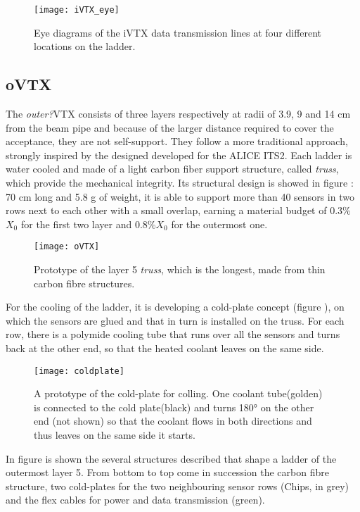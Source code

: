 \begin{figure}[h!]
\centering
\texttt{[image: iVTX\_eye]}
\caption{Eye diagrams of the iVTX data transmission lines at four different locations on the ladder.}
\label{fig:iVTX_eye}
\end{figure}


\subsection{oVTX}

The \textit{outer?}VTX consists of three layers respectively at radii of 3.9, 9 and 14 cm from the beam pipe and because of the larger distance required to cover the acceptance, they are not self-support. They follow a more traditional approach, strongly inspired by the designed developed for the ALICE ITS2. Each ladder is water cooled and made of a light carbon fiber support structure, called \textit{truss}, which provide the mechanical integrity. Its structural design is showed in figure : 70 cm long and 5.8 g of weight, it is able to support more than 40 sensors in two rows next to each other with a small overlap, earning a material budget of 0.3\% $X_{0}$ for the first two layer and 0.8\%$X_{0}$  for the outermost one.

\begin{figure}[h!]
\centering
\texttt{[image: oVTX]}
\caption{Prototype of the layer 5 \textit{truss}, which is the longest, made from thin carbon fibre structures.}
\label{fig:oVTX}
\end{figure}


For the cooling of the ladder, it is developing a cold-plate concept (figure ), on which the sensors are glued and that in turn is installed on the truss. For each row, there is a polymide cooling tube that runs over all the sensors and turns back at the other end, so that the heated coolant leaves on the same side.

\begin{figure}[h!]
\centering
\texttt{[image: coldplate]}
\caption{A prototype of the cold-plate for colling. One coolant tube(golden) is connected to the cold plate(black) and turns 180° on the other end (not shown) so that the coolant flows in both directions and thus leaves on the same side it starts.}
\label{fig:oVTX_coldplate}
\end{figure}


In figure  is shown the several structures described that shape a ladder of the outermost layer 5. From bottom to top come in succession the carbon fibre structure, two cold-plates for the two neighbouring sensor rows (Chips, in grey) and the flex cables for power and data transmission (green). 


